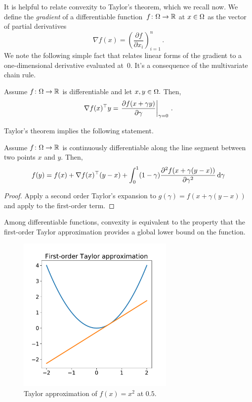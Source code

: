 It is helpful to relate convexity to Taylor's theorem, which we recall now. We define the \emph{gradient} of a differentiable function~$f\colon\Omega\to\mathbb{R}$ at $x\in\Omega$ as the vector of partial derivatives
\[
\nabla f(x) = \left( \frac{\partial f}{\partial x_i} \right)_{i=1}^n\,.
\]
We note the following simple fact that relates linear forms of the gradient to a
one-dimensional derivative evaluated at~$0.$ It's a consequence of the multivariate chain rule.
\begin{fact}
Assume $f\colon\Omega\to\mathbb{R}$ is differentiable and let $x,y\in\Omega.$ Then,
\[
\nabla f(x)^\top y
= \left.\frac{\partial f(x+\gamma y)}{\partial \gamma}\right|_{\gamma=0}\,.
\]
\end{fact}
Taylor's theorem implies the following statement.
\begin{proposition}
Assume $f\colon\Omega\to\mathbb{R}$ is continuously differentiable along the line segment between two points $x$ and $y.$ Then,
\[
f(y) = f(x) 
+ \nabla f(x)^\top (y-x)
+ \int_0^1 (1-\gamma)\frac{\partial^2 f(x+\gamma(y-x))}{\partial\gamma^2}\,\mathrm{d}\gamma
\]
\end{proposition}
\begin{proof}
Apply a second order Taylor's expansion to $g(\gamma)=f(x+\gamma(y-x))$ and apply  to the first-order term. 
\end{proof}

Among differentiable functions, convexity is equivalent to the property that the first-order Taylor approximation provides a global lower bound on the function.

\begin{figure}
\begin{center}
\includegraphics[width=3in]{figures/lecture1-taylor}
\end{center}
\caption{Taylor approximation of $f(x)=x^2$ at $0.5.$}
\end{figure}

